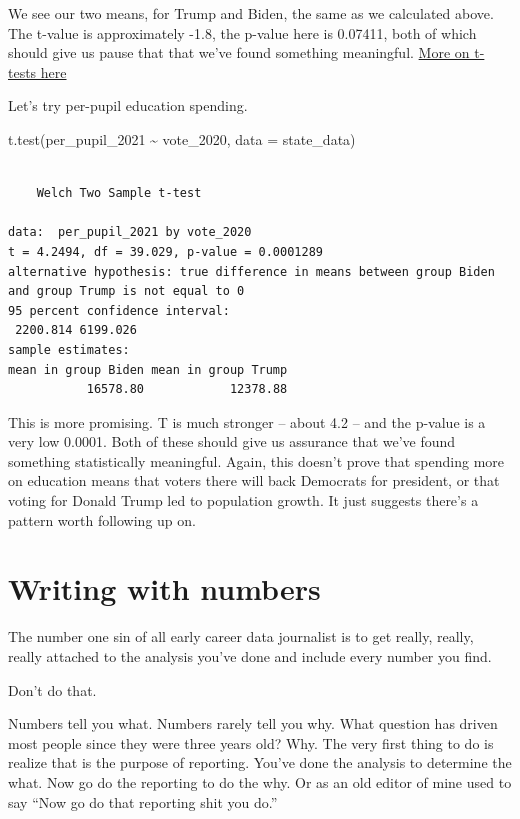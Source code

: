 \documentclass[
  letterpaper,
  DIV=11,
  numbers=noendperiod]{scrreprt}
\newenvironment{Shaded}{\begin{snugshade}}{\end{snugshade}}
\newcommand{\AttributeTok}[1]{\textcolor[rgb]{0.40,0.45,0.13}{#1}}
\newcommand{\FunctionTok}[1]{\textcolor[rgb]{0.28,0.35,0.67}{#1}}
\newcommand{\NormalTok}[1]{\textcolor[rgb]{0.00,0.23,0.31}{#1}}
\newcommand{\SpecialCharTok}[1]{\textcolor[rgb]{0.37,0.37,0.37}{#1}}
\begin{document}
We see our two means, for Trump and Biden, the same as we calculated
above. The t-value is approximately -1.8, the p-value here is 0.07411,
both of which should give us pause that that we've found something
meaningful.
\href{https://conjointly.com/kb/statistical-student-t-test/}{More on
t-tests here}

Let's try per-pupil education spending.

\begin{Shaded}
\begin{Highlighting}[]
\FunctionTok{t.test}\NormalTok{(per\_pupil\_2021 }\SpecialCharTok{\textasciitilde{}}\NormalTok{ vote\_2020, }\AttributeTok{data =}\NormalTok{ state\_data)}
\end{Highlighting}
\end{Shaded}

\begin{verbatim}

    Welch Two Sample t-test

data:  per_pupil_2021 by vote_2020
t = 4.2494, df = 39.029, p-value = 0.0001289
alternative hypothesis: true difference in means between group Biden and group Trump is not equal to 0
95 percent confidence interval:
 2200.814 6199.026
sample estimates:
mean in group Biden mean in group Trump 
           16578.80            12378.88 
\end{verbatim}

This is more promising. T is much stronger -- about 4.2 -- and the
p-value is a very low 0.0001. Both of these should give us assurance
that we've found something statistically meaningful. Again, this doesn't
prove that spending more on education means that voters there will back
Democrats for president, or that voting for Donald Trump led to
population growth. It just suggests there's a pattern worth following up
on.


\hypertarget{writing-with-numbers}{%
\chapter{Writing with numbers}\label{writing-with-numbers}}

The number one sin of all early career data journalist is to get really,
really, really attached to the analysis you've done and include every
number you find.

Don't do that.

Numbers tell you what. Numbers rarely tell you why. What question has
driven most people since they were three years old? Why. The very first
thing to do is realize that is the purpose of reporting. You've done the
analysis to determine the what. Now go do the reporting to do the why.
Or as an old editor of mine used to say ``Now go do that reporting shit
you do.''
\end{document}
